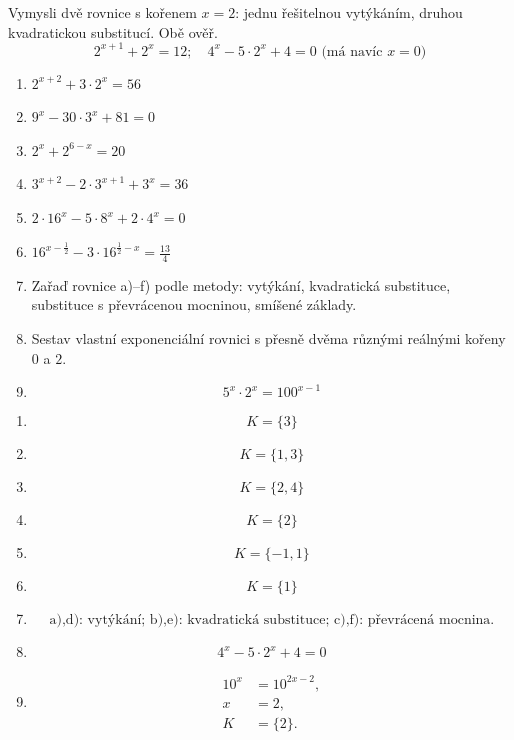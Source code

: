 \documentclass[11pt,a4paper]{article}
\begin{document}
\begin{zadaniReseniBox}[title={Rozšíření 1}]
Vymysli dvě rovnice s kořenem $x=2$: jednu řešitelnou vytýkáním, druhou kvadratickou substitucí. Obě ověř.
\tcblower
\[
2^{x+1}+2^x=12;\quad 4^x-5\cdot2^x+4=0\text{ (má navíc }x=0\text{)}
\]
\end{zadaniReseniBox}
\begin{zadaniReseniBox}[title={Domácí úkol}]
\begin{enumerate}[label=\alph*)]
\item $2^{x+2}+3\cdot2^x=56$
\item $9^x-30\cdot3^x+81=0$
\item $2^x+2^{6-x}=20$
\item $3^{x+2}-2\cdot3^{x+1}+3^x=36$
\item $2\cdot16^x-5\cdot8^x+2\cdot4^x=0$
\item $16^{x-\frac{1}{2}}-3\cdot16^{\frac{1}{2}-x}=\frac{13}{4}$
\item Zařaď rovnice a)--f) podle metody: vytýkání, kvadratická substituce, substituce s převrácenou mocninou, smíšené základy.
\item Sestav vlastní exponenciální rovnici s přesně dvěma různými reálnými kořeny $0$ a $2$.
\item \[ 5^x\cdot2^x=100^{x-1} \]
\end{enumerate}
\tcblower
\setlength{\abovedisplayskip}{2pt}\setlength{\belowdisplayskip}{2pt}
\setlength{\abovedisplayshortskip}{2pt}\setlength{\belowdisplayshortskip}{2pt}
\begin{enumerate}[label=\alph*)]
\item \[K=\{3\}\]
\item \[K=\{1,3\}\]
\item \[K=\{2,4\}\]
\item \[K=\{2\}\]
\item \[K=\{-1,1\}\]
\item \[K=\{1\}\]
\item \[\text{a),d): vytýkání; b),e): kvadratická substituce; c),f): převrácená mocnina.}\]
\item \[4^x-5\cdot2^x+4=0\]
\item \[\begin{aligned}10^x&=10^{2x-2},\\x&=2,\\K&=\{2\}.\end{aligned}\]
\end{enumerate}
\end{zadaniReseniBox}
\end{document}
